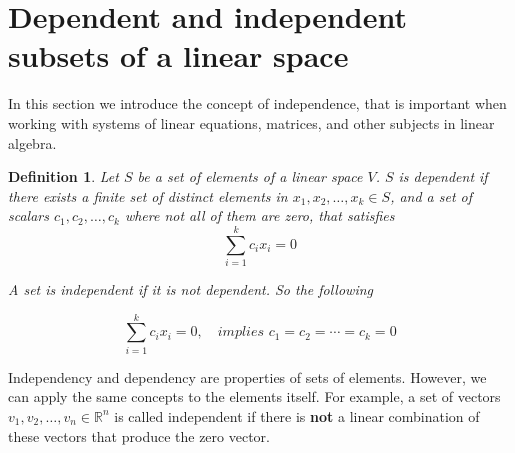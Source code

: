 \documentclass{book}
\newtheorem{definition}{Definition}[chapter]
\begin{document}
\section{Dependent and independent subsets of a linear space}

In this section we introduce the concept of independence, that is important
when working with systems of linear equations, matrices, and other subjects in
linear algebra.

\begin{definition}
    Let $S$ be a set of elements of a linear space $V$. $S$ is dependent if there
    exists a finite set of distinct elements in $x_1,x_2,\dots,x_k\in S$, and a
    set of scalars $c_1,c_2,\dots,c_k$ where not all of them are zero, that satisfies
    \[
        \sum_{i=1}^{k}{c_i x_i} = 0
    \]

    A set is independent if it is not dependent. So the following

    \[
        \sum_{i=1}^{k}{c_i x_i} = 0, \quad \textit{implies } c_1 = c_2 = \cdots = c_k =0
    \]
\end{definition}

Independency and dependency are properties of sets of elements. However, we can
apply the same concepts to the elements itself. For example, a set of vectors
$v_1, v_2, \dots, v_n \in \mathbb R^{n}$ is called independent if there is
\textbf{not} a linear combination of these vectors that produce the zero
vector.
\end{document}
